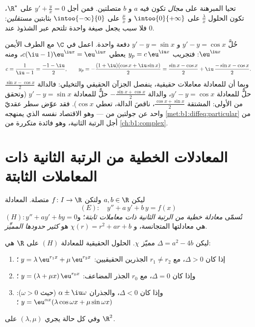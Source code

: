 \begin{remark}
تحيا المبرهنة على \emph{مجال} تكون فيه $a$ و $b$
متصلتين. فمن أجل $y' + \frac yx = 0$ على $\R^*$، تكون الحلول
$\frac{\lambda}{x}$ على $\intoo{0}{+\infty}$ و
$\frac{\mu}{x}$ على $\intoo{-\infty}{0}$ بثابتين
\emph{مستقلين}: فلا سبب يجعل صيغة واحدة تلتحم عبر
الشذوذ عند $0$.
\end{remark}

\begin{example}\label{ex:b1:diffeq:complexrhs}
حُلَّ $y' - y = \cos x$ و $y' - y = \sin x$ دفعة واحدة. اعمل
في $\C$ مع الطرف الأيمن $\eu^{\iu x}$: فتجريب $y_p =
c\,\eu^{\iu x}$ يعطي $c(\iu - 1)\eu^{\iu x} = \eu^{\iu x}$، ومنه
\[
c = \frac1{\iu - 1} = \frac{-1 - \iu}2,
\qquad
y_p = -\frac{(1 + \iu)(\cos x + \iu\sin x)}2
= \frac{\sin x - \cos x}2 + \iu\,\frac{-\sin x - \cos x}2 .
\]
وبما أن للمعادلة معاملات حقيقية، ينفصل الجزآن الحقيقي
والتخيلي: فالدالة $\frac{\sin x - \cos x}2$ حلٌّ للمعادلة $y' - y = \cos x$،
والدالة $-\frac{\sin x + \cos x}2$ حلٌّ للمعادلة $y' - y = \sin x$ (وتحقق
من الأولى: المشتقة $\frac{\cos x + \sin x}2$، ناقصَ
الدالة، تعطي $\cos x$). فقد عوّض سطر عقديّ واحد عن جولتين من
 --- وهو الاقتصاد نفسه الذي يمنهجه
\cref{met:b1:diffeq:particular} من أجل الرتبة الثانية،
وهو فائدة متكررة من \cref{ch:b1:complex}.
\end{example}

\section{المعادلات الخطية من الرتبة الثانية ذات المعاملات الثابتة}

\begin{definition}\label{def:b1:diffeq:linear2}
ليكن $a, b \in \R$ ولتكن $f \colon I \to \R$ متصلة. المعادلة
\[
(E)\colon\quad y'' + a\,y' + b\,y = f(x)
\]
تُسمّى \emph{معادلة خطية من الرتبة الثانية ذات معاملات
ثابتة}؛
و$(H)\colon y'' + ay' + by = 0$ هي معادلتها المتجانسة، و
$\chi(r) = r^2 + ar + b$ هو \emph{كثير حدودها
المميِّز}.
\end{definition}

\begin{theorem}\label{thm:b1:diffeq:homogeneous2}
ليكن $\Delta = a^2 - 4b$ مميّز $\chi$. الحلول الحقيقية
للمعادلة $(H)$ على $\R$ هي:
\begin{enumerate}
  \item إذا كان $\Delta > 0$، مع $r_1 \neq r_2$ الجذرين الحقيقيين:
        $\;y = \lambda\, \eu^{r_1 x} + \mu\, \eu^{r_2 x}$؛
  \item وإذا كان $\Delta = 0$، مع $r_0$ الجذر المضاعف:
        $\;y = (\lambda + \mu x)\, \eu^{r_0 x}$؛
  \item وإذا كان $\Delta < 0$، والجذران $\alpha \pm \iu\omega$
        (حيث $\omega > 0$):
        $\;y = \eu^{\alpha x} (\lambda \cos\omega x + \mu
        \sin\omega x)$؛
\end{enumerate}
وفي كل حالة يجري $(\lambda, \mu)$ على $\R^2$.
\end{theorem}

